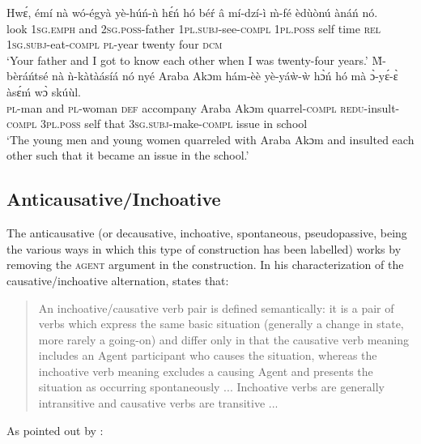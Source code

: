\documentclass[output=paper]{langsci/langscibook}
\begin{document}
\ea\label{ex:32.osam}
\ea\label{ex:32a.osam}
\gll   Hwɛ́,  émí     nà   wó-égyà     yè-húń-ǹ hɛ́ń    hó   béŕ   â  mí-dzí-ì     \`{m}-fé   èdùònú   ànáń nó. \\
       look  \textsc{1sg.emph}  and  \textsc{2sg.poss}-father  \textsc{1pl.subj}-see-\textsc{compl} \textsc{1pl.poss}  self  time  \textsc{rel}  \textsc{1sg.subj}-eat-\textsc{compl}  \textsc{pl}-year twenty    four    \textsc{dcm}\\
\glt `Your father and I got to know each other when I was twenty-four years.' \citep[9]{martin1936}
\ex\label{ex:32b.osam}
\gll  \`{M}-bèráńtsé  nà  ǹ-kàtàásíá  nó   nyé     Araba Akɔm  hám-èè      yè-yáẁ-ẁ    hɔ̀ń    hó  mà ɔ̀-yɛ́-ɛ̀        àsɛ́ḿ  wɔ̀  skúùl. \\
       \textsc{pl}-man    and  \textsc{pl}-woman  \textsc{def}  accompany  Araba Akɔm quarrel-\textsc{compl}    \textsc{redu}-insult-\textsc{compl}  \textsc{3pl.poss}  self  that \textsc{3sg.subj}-make-\textsc{compl}  issue  in  school\\
\glt `The young men and young women quarreled with Araba Akɔm and insulted each other such that it became an issue in the school.' \citep[21]{martin1936}  
\z 
\z 


\subsection{Anticausative/Inchoative}\label{§4.3:anticausative.osam}

The anticausative (or decausative, inchoative, spontaneous, pseudopassive, being the various ways in which this type of construction has been labelled) works by removing the \textsc{agent} argument in the construction. In his characterization of the causative/inchoative alternation, \citeauthor{haspelmath1993} states that:

\begin{quote}
An inchoative/causative verb pair is defined semantically: it is a pair of verbs which express the same basic situation (generally a change in state, more rarely a going-on) and differ only in that the causative verb meaning includes an Agent participant who causes the situation, whereas the inchoative verb meaning excludes a causing Agent and presents the situation as occurring spontaneously ... Inchoative verbs are generally intransitive and causative verbs are transitive ... \citep[90]{haspelmath1993}
\end{quote}

As pointed out by \citet[1132]{haspelmathmuellerbardey2004}: 
\end{document}
